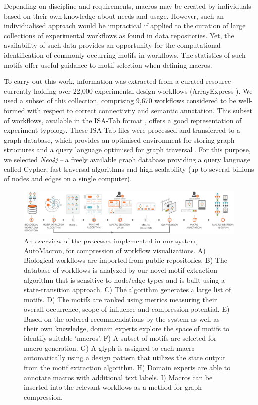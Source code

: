 \vspace{-1mm}
Depending on discipline and requirements, macros may be created by individuals based on their own knowledge about needs and usage.
However, such an individualised approach would be impractical if applied to the curation of large collections of experimental workflows as found in data repositories.
Yet, the availability of such data provides an opportunity for the computational identification of commonly occurring motifs in workflows.
The statistics of such motifs offer useful guidance to motif selection when defining macros.

To carry out this work, information was extracted from a curated resource currently holding over 22,000 experimental design workflows (ArrayExpress \cite{ArrayExpress::2012}).
We used a subset of this collection, comprising 9,670 workflows considered to be well-formed with respect to correct connectivity and semantic annotation.
This subset of workflows, available in the ISA-Tab format \cite{rocca-serra10, sansone12}, offers a good representation of experiment typology.
These ISA-Tab files were processed and transferred to a graph database, which provides an optimised environment for storing graph structures and a query language optimised for graph traversal \cite{batra12}. 
For this purpose, we selected \emph{Neo4j} \cite{Neo4J::2012} -- a freely available graph database providing a query language called Cypher, fast traversal algorithms and high scalability (up to several billions of nodes and edges on a single computer).

\begin{figure}[h!]
\centering
\includegraphics[width=\textwidth]{images/automacron/teaser}
\caption{An overview of the processes implemented in our system, AutoMacron, for compression of workflow visualizations. A) Biological workflows are imported from public repositories. B) The database of workflows is analyzed by our novel motif extraction algorithm that is sensitive to node/edge types and is built using a state-transition approach. C) The algorithm generates a large list of motifs. D) The motifs are ranked using metrics measuring their overall occurrence, scope of influence and compression potential. E) Based on the ordered recommendations by the system as well as their own knowledge, domain experts explore the space of motifs to identify suitable `macros'. F) A subset of motifs are selected for macro generation. G) A glyph is assigned to each macro automatically using a design pattern that utilizes the state output from the motif extraction algorithm. H) Domain experts are able to annotate macros with additional text labels. I) Macros can be inserted into the relevant workflows as a method for graph compression.}
\label{fig:automacron-teaser}
\end{figure}

